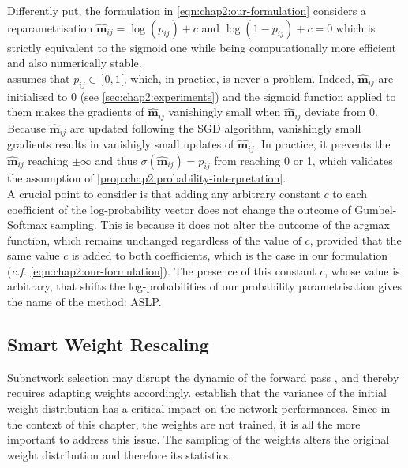 Differently put, the formulation in \cref{eqn:chap2:our-formulation} considers a
reparametrisation $\bm{\hat{m}}_{ij} = \log(p_{ij})+c$ and $\log(1-p_{ij})+ c =0$ which is strictly
equivalent to the sigmoid one while being computationally more efficient and
also numerically stable.\\

 assumes that $p_{ij}\in ~ ]0,1[$,
which, in practice, is never a problem. Indeed, $\bm{\hat{m}}_{ij}$ are
initialised to 0 (see \cref{sec:chap2:experiments}) and the sigmoid function
applied to them makes the gradients of $\bm{\hat{m}}_{ij}$ vanishingly small
when $\bm{\hat{m}}_{ij}$ deviate from 0. Because $\bm{\hat{m}}_{ij}$ are updated
following the \ac{SGD} algorithm, vanishingly small gradients results in
vanishigly small updates of $\bm{\hat{m}}_{ij}$. In practice, it prevents the
$\bm{\hat{m}}_{ij}$ reaching $\pm\infty$ and thus
$\sigma(\bm{\hat{m}}_{ij})=p_{ij}$ from reaching 0 or 1, which validates the
assumption of \cref{prop:chap2:probability-interpretation}.\\

A crucial point to consider is that adding any arbitrary constant $c$ to each
coefficient of the log-probability vector does not change the outcome of
Gumbel-Softmax sampling. This is because it does not alter the outcome of the
argmax function, which remains unchanged regardless of the value of $c$,
provided that the same value $c$ is added to both coefficients, which is the case
in our formulation (\emph{c.f.} \cref{eqn:chap2:our-formulation}). The
presence of this constant $c$, whose value is arbitrary, that shifts the
log-probabilities of our probability parametrisation gives the name of the
method: \acl{ASLP}.\\



\subsection{Smart Weight Rescaling}
\label{sec:chap2:smart-rescale}
Subnetwork selection may disrupt the dynamic of the forward pass
\cite{DBLP:conf/iccv/HeZRS15,DBLP:conf/cvpr/RamanujanWKFR20}, and thereby
requires adapting weights accordingly. \cite{DBLP:conf/iccv/HeZRS15} establish
that the variance of the initial weight distribution has a critical impact on
the network performances. Since in the context of this chapter, the weights are
not trained, it is all the more important to address this issue. The sampling of
the weights alters the original weight distribution and therefore its
statistics.\\

